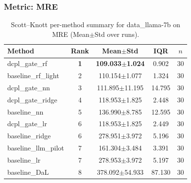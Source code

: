 \subsubsection*{Metric: MRE}
\begin{table}[H]
\centering
\scriptsize
\setlength{\tabcolsep}{4pt}
\renewcommand{\arraystretch}{1.1}
\caption{Scott--Knott per-method summary for data\_llama-7b on MRE (Mean$\pm$Std over runs).}
\label{tab:sk_data_llama-7b_MRE}
\begin{tabular}{l|c|c|c|c}
\hline
\textbf{Method} & \textbf{Rank} & \textbf{Mean$\pm$Std} & \textbf{IQR} & \textbf{$n$} \\
\hline
\rowcolor{red!15} dcpl\_gate\_rf & \textbf{1} & \textbf{109.033$\pm$1.024} & 0.902 & 30 \\
baseline\_rf\_light & 2 & 110.154$\pm$1.077 & 1.324 & 30 \\
dcpl\_gate\_nn & 3 & 111.895$\pm$11.195 & 14.795 & 30 \\
dcpl\_gate\_ridge & 4 & 118.953$\pm$1.825 & 2.448 & 30 \\
baseline\_nn & 5 & 136.990$\pm$8.785 & 12.595 & 30 \\
dcpl\_gate\_lr & 6 & 118.953$\pm$1.825 & 2.449 & 30 \\
baseline\_ridge & 6 & 278.951$\pm$3.972 & 5.196 & 30 \\
baseline\_llm\_pilot & 7 & 161.304$\pm$3.484 & 3.391 & 30 \\
baseline\_lr & 7 & 278.953$\pm$3.972 & 5.197 & 30 \\
baseline\_DaL & 8 & 378.092$\pm$54.933 & 87.130 & 30 \\
\hline
\end{tabular}
\end{table}
